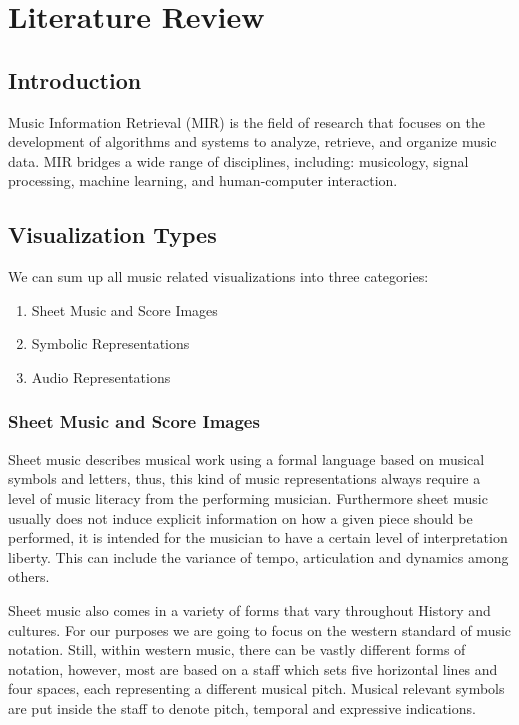 \chapter{Literature Review} \label{chap:sota}
\section{Introduction}

Music Information Retrieval (MIR) is the field of research that focuses on the development of algorithms and systems to analyze, retrieve, and organize music data. MIR bridges a wide range of disciplines, including: musicology, signal processing, machine learning, and human-computer interaction. 
\cite{mullerFundamentalsMusicProcessing2015}

\section{Visualization Types}\label{sec:dialecto}

We can sum up all music related visualizations into three categories:
\begin{enumerate}
    \item Sheet Music and Score Images
    \item Symbolic Representations
    \item Audio Representations
\end{enumerate}

\subsection{Sheet Music and Score Images}

Sheet music describes musical work using a formal language based on musical symbols and letters, thus, this kind of music representations always require  a level of music literacy from the performing musician. Furthermore sheet music usually does not induce explicit information on how a given piece should be performed, it is intended for the musician to have a certain level of interpretation liberty. This can include the variance of tempo, articulation and dynamics among others.

Sheet music also comes in a variety of forms that vary throughout History and cultures. For our purposes we are going to focus on the western standard of music notation. Still, within western music, there can be vastly different forms of notation, however, most are based on a staff which sets five horizontal lines and four spaces, each representing a different musical pitch. Musical relevant symbols are put inside the staff to denote pitch, temporal and expressive indications. \cite{mullerMusicRepresentations2015a}

